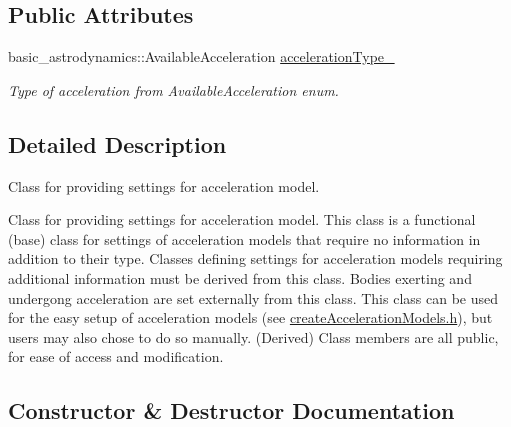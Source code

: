 \subsection*{Public Attributes}
\begin{DoxyCompactItemize}
\item 
basic\+\_\+astrodynamics\+::\+Available\+Acceleration \hyperlink{classtudat_1_1simulation__setup_1_1AccelerationSettings_aaf1f7742077003cf7055c96ec934e4d8}{acceleration\+Type\+\_\+}\hypertarget{classtudat_1_1simulation__setup_1_1AccelerationSettings_aaf1f7742077003cf7055c96ec934e4d8}{}\label{classtudat_1_1simulation__setup_1_1AccelerationSettings_aaf1f7742077003cf7055c96ec934e4d8}

\begin{DoxyCompactList}\small\item\em Type of acceleration from Available\+Acceleration enum. \end{DoxyCompactList}\end{DoxyCompactItemize}


\subsection{Detailed Description}
Class for providing settings for acceleration model. 

Class for providing settings for acceleration model. This class is a functional (base) class for settings of acceleration models that require no information in addition to their type. Classes defining settings for acceleration models requiring additional information must be derived from this class. Bodies exerting and undergong acceleration are set externally from this class. This class can be used for the easy setup of acceleration models (see \hyperlink{createAccelerationModels_8h_source}{create\+Acceleration\+Models.\+h}), but users may also chose to do so manually. (Derived) Class members are all public, for ease of access and modification. 

\subsection{Constructor \& Destructor Documentation}

